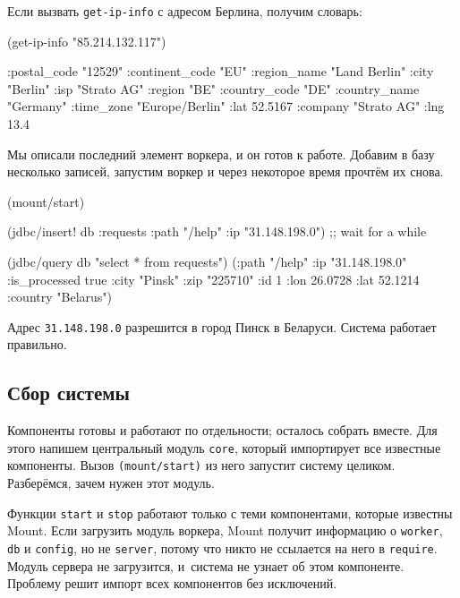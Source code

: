 \noindent
Если вызвать \verb|get-ip-info| с адресом Берлина, получим словарь:

\begin{english}
  \begin{clojure}
(get-ip-info "85.214.132.117")

{:postal_code "12529"
 :continent_code "EU"
 :region_name "Land Berlin"
 :city "Berlin"
 :isp "Strato AG"
 :region "BE"
 :country_code "DE"
 :country_name "Germany"
 :time_zone "Europe/Berlin"
 :lat 52.5167
 :company "Strato AG"
 :lng 13.4}
  \end{clojure}
\end{english}

Мы описали последний элемент воркера, и он готов к работе. Добавим в базу
несколько записей, запустим воркер и через некоторое время прочтём их снова.

\begin{english}
  \begin{clojure}
(mount/start)

(jdbc/insert! db :requests {:path "/help" :ip "31.148.198.0"})
;; wait for a while

(jdbc/query db "select * from requests")
({:path "/help" :ip "31.148.198.0" :is_processed true
  :city "Pinsk" :zip "225710" :id 1
  :lon 26.0728 :lat 52.1214 :country "Belarus"})
  \end{clojure}
\end{english}

Адрес \verb|31.148.198.0| разрешится в город Пинск в Беларуси. Система работает
правильно.

\subsection{Сбор системы}


Компоненты готовы и работают по отдельности; осталось собрать вместе. Для этого
напишем центральный модуль \verb|core|, который импортирует все известные
компоненты. Вызов \verb|(mount/start)| из него запустит систему
целиком. Разберёмся, зачем нужен этот модуль.

Функции \verb|start| и \verb|stop| работают только с теми компонентами, которые
известны Mount. Если загрузить модуль воркера, Mount получит информацию о
\verb|worker|, \verb|db| и \verb|config|, но не \verb|server|, потому что никто
не ссылается на него в \verb|require|. Модуль сервера не загрузится, и~система
не узнает об этом компоненте. Проблему решит импорт всех компонентов без
исключений.

